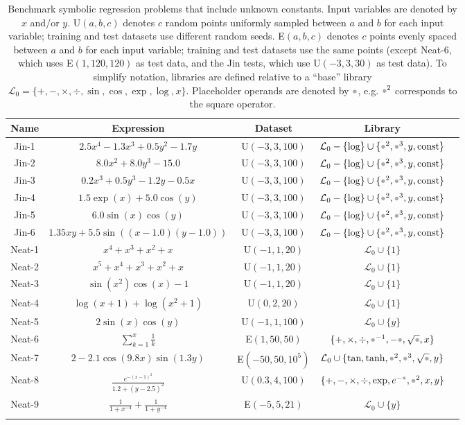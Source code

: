 \documentclass{article}
\newcommand{\placeholder}{\mathord{\color{black!33}\bullet}}
\newcommand{\base}{\mathcal{L}_0}
\newcommand{\NguyenXY}{$\base \cup \{ y \}$}
\newcommand{\NguyenXOne}{$\base \cup \{ 1 \}$}
\newcommand{\Jin}{$\base - \{ \log \} \cup \{\placeholder^2, \placeholder^3, y, \textrm{const} \}$}
\newcommand{\Keijzer}{$\{ +, \times, \div, \placeholder^{-1}, -\placeholder, \sqrt{\placeholder}, x \}$}
\newcommand{\Korns}{$\base \cup \{ \tan, \tanh, \placeholder^2, \placeholder^3, \sqrt{\placeholder}, y \}$}
\newcommand{\VladislavlevaB}{$\{ +, -, \times, \div, \exp, e^{-\placeholder}, \placeholder^2, x, y \}$}
\begin{document}
\begin{table*}[h]
\centering
\caption{
Benchmark symbolic regression problems that include unknown constants.
Input variables are denoted by $x$ and/or $y$.
U$(a, b, c)$ denotes $c$ random points uniformly sampled between $a$ and $b$ for each input variable; training and test datasets use different random seeds.
E$(a, b, c)$ denotes $c$ points evenly spaced between $a$ and $b$ for each input variable; training and test datasets use the same points (except Neat-6, which uses E$(1, 120, 120)$ as test data, and the Jin tests, which use U$(-3, 3, 30)$ as test data).
To simplify notation, libraries are defined relative to a ``base'' library $\base = \{ +, -, \times, \div, \sin, \cos, \exp, \log, x \}$.
Placeholder operands are denoted by $\placeholder$, e.g. $\placeholder^2$ corresponds to the square operator.}
\begin{small}
\begin{tabular}{ccccc}
Name & Expression & Dataset & Library \\  
\midrule
Jin-1 & $2.5 x^4-1.3 x^3 +0.5 y^2 - 1.7y$ & U$(-3, 3, 100)$ & \Jin \\
Jin-2 & $8.0 x^2 + 8.0 y^3 - 15.0$ & U$(-3, 3, 100)$ & \Jin \\
Jin-3 & $0.2 x^3 + 0.5 y^3 - 1.2 y - 0.5 x$ & U$(-3, 3, 100)$ & \Jin \\
Jin-4 & $1.5 \exp(x) + 5.0 \cos(y)$ & U$(-3, 3, 100)$ & \Jin \\
Jin-5 & $6.0 \sin(x) \cos(y)$ & U$(-3, 3, 100)$ & \Jin \\
Jin-6 & $1.35 x y + 5.5 \sin((x - 1.0)(y - 1.0))$ & U$(-3, 3, 100)$ & \Jin \\
\midrule
Neat-1 & $x^4+x^3+x^2+x$ & U$(-1, 1, 20)$ & \NguyenXOne \\
Neat-2 & $x^5+x^4+x^3+x^2+x$ & U$(-1, 1, 20)$ & \NguyenXOne \\
Neat-3 & $\sin(x^2)\cos(x)-1$ & U$(-1, 1, 20)$ & \NguyenXOne \\
Neat-4 & $\log(x+1)+\log(x^2+1)$ & U$(0, 2, 20)$ & \NguyenXOne \\
Neat-5 & $2\sin(x)\cos(y)$ & U$(-1, 1, 100)$ & \NguyenXY \\
Neat-6 & $\sum_{k=1}^x \frac{1}{k} $ & E$(1, 50, 50)$ & \Keijzer \\
Neat-7 & $2 - 2.1\cos(9.8x)\sin(1.3y)$ & E$(-50, 50, 10^5)$ & \Korns \\
Neat-8 & $\frac{e^{-(x-1)^2}}{1.2 + (y-2.5)^2}$ & U$(0.3, 4, 100)$ & \VladislavlevaB \\
Neat-9 & $\frac{1}{1+x^{-4}} + \frac{1}{1+y^{-4}}$ & E$(-5, 5, 21)$ & \NguyenXY \\
\newline
\end{tabular}
\end{small}
\label{tab:benchmarks-const}
\end{table*}
\end{document}
